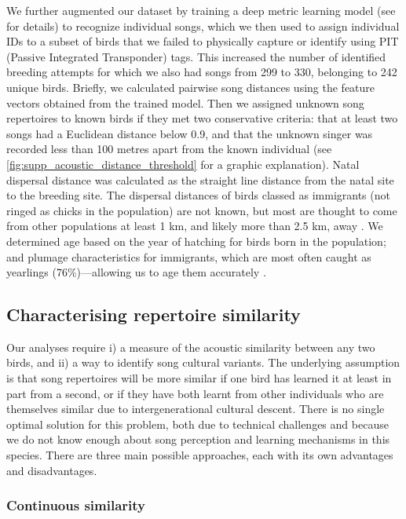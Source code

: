 \documentclass[9pt, twocolumn, twoside]{gsajnl}
\begin{document}
We further augmented our dataset by training a deep metric learning model (see \parencite{merinorecalde2023a} for details) to recognize individual songs, which we then used to assign individual IDs to a subset of birds that we failed to physically capture or identify using PIT (Passive Integrated Transponder) tags. This increased the number of identified breeding attempts for which we also had songs from 299 to 330, belonging to 242 unique birds. Briefly, we calculated pairwise song distances using the feature vectors obtained from the trained model. Then we assigned unknown song repertoires to known birds if they met two conservative criteria: that at least two songs had a Euclidean distance below 0.9, and that the unknown singer was recorded less than 100 metres apart from the known individual (see \autoref{fig:supp_acoustic_distance_threshold} for a graphic explanation).
Natal dispersal distance was calculated as the straight line distance from the natal site to the breeding site. The dispersal distances of birds classed as immigrants (not ringed as chicks in the population) are not known, but most are thought to come from other populations at least 1 km, and likely more than 2.5 km, away \parencite{verhulst1997, quinn2011}. We determined age based on the year of hatching for birds born in the population; and plumage characteristics for immigrants, which are most often caught as yearlings (76\%)---allowing us to age them accurately \parencite{woodman2023}.

\subsection{Characterising repertoire similarity}

Our analyses require i) a measure of the acoustic similarity between any two birds, and ii) a way to identify song cultural variants.  The underlying assumption is that song repertoires will be more similar if one bird has learned it at least in part from a second, or if they have both learnt from other individuals who are themselves similar due to intergenerational cultural descent. There is no single optimal solution for this problem, both due to technical challenges and because we do not know enough about song perception and learning mechanisms in this species. There are three main possible approaches, each with its own advantages and disadvantages.

\subsubsection{Continuous similarity}
\label{song-similarity}
\end{document}
